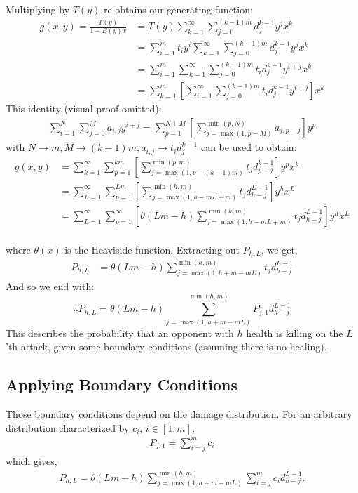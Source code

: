 		Multiplying by $T(y)$ re-obtains our generating function:
		\begin{align}
			g(x, y) = \frac{T(y)}{1-B(y)x} &= T(y)\sum_{k=1}^\infty \sum_{j=0}^{(k-1)m} d_j^{k-1} y^j x^k\\
			&= \sum_{i=1}^m t_i y^i\sum_{k=1}^\infty \sum_{j=0}^{(k-1)m} d_j^{k-1} y^j x^k\\
			&= \sum_{i=1}^m \sum_{k=1}^\infty \sum_{j=0}^{(k-1)m} t_i d_j^{k-1} y^{i+j} x^k\\
			&= \sum_{k=1}^m \left[\sum_{i=1}^\infty  \sum_{j=0}^{(k-1)m} t_i d_j^{k-1} y^{i+j} \right] x^k
		\end{align}
		This identity (visual proof omitted):
		\begin{align}
			\sum_{i=1}^N \sum_{j=0}^M a_{i, j}y^{i+j} = \sum_{p=1}^{N+M}\left[ \sum_{j=\max(1, p-M)}^{\min(p, N)} a_{j, p-j}\right]y^p
		\end{align}
		with $N\to m, M\to (k-1)m, a_{i, j}\to t_i d_j^{k-1}$ can be used to obtain:
		\begin{align}
			g(x, y) &= \sum_{k=1}^\infty \sum_{p=1}^{km}\left[ \sum_{j=\max(1, p-(k-1)m)}^{\min(p, m)} t_j d_{p-j}^{k-1}\right]y^p x^k\\
			&= \sum_{L=1}^\infty \sum_{p=1}^{Lm}\left[ \sum_{j=\max(1, h-mL+m)}^{\min(h, m)} t_j d_{h-j}^{L-1}\right]y^h x^L\\
			&= \sum_{L=1}^\infty \sum_{p=1}^\infty\left[ \theta(Lm - h) \sum_{j=\max(1, h-mL+m)}^{\min(h, m)} t_j d_{h-j}^{L-1}\right]y^h x^L\\
		\end{align}
		

		where $\theta(x)$ is the Heaviside function. Extracting out $P_{h, L}$, we get,
		\begin{align}
			P_{h, L} &= \theta(Lm-h)\sum_{j=\max(1, h+m-mL)}^{\min(h, m)} t_j d_{h-j}^{L-1}
		\end{align}
		And so we end with:
		\begin{equation}
			\boxed{\therefore P_{h, L} = \theta(Lm-h)\sum_{j=\max(1, h+m-mL)}^{\min(h, m)} P_{j, 1} d_{h-j}^{L-1} }
		\end{equation}
		This describes the probability that an opponent with $h$ health is killing on the $L$'th attack, given some boundary conditions (assuming there is no healing).

		\subsection{Applying Boundary Conditions}
			Those boundary conditions depend on the damage distribution. For an arbitrary distribution characterized by $c_i,\,i\in[1, m]$,
			\begin{align}
				P_{j, 1} = \sum_{i=j}^m c_i
			\end{align}
			which gives,
			\begin{align}
				P_{h, L} = \theta(Lm-h)\sum_{j=\max(1, h+m-mL)}^{\min(h, m)} \sum_{i=j}^m c_i d_{h-j}^{L-1}.
			\end{align}
			
